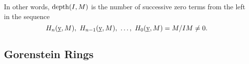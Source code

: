 \begin{remark}
    In other words, $\operatorname{depth}(I, M)$ is the number of successive zero terms from the left in the sequence
    \begin{equation*}
        H_n(\underbar{y}, M),~H_{n - 1}(\underbar{y}, M),~\dots,~H_0(\underbar{y}, M) = M/IM\ne 0.
    \end{equation*}
\end{remark}



\subsection{Gorenstein Rings}


